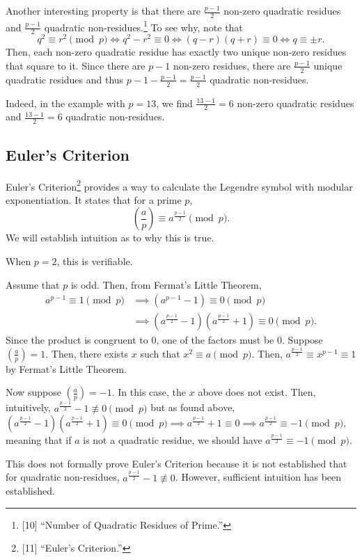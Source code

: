 \documentclass{article}
\newcommand{\qrn}[2]{\left( \frac{#1}{#2}\right)}
\begin{document}
Another interesting property is that there are $\frac{p-1}{2}$ non-zero quadratic residues and $\frac{p-1}{2}$ quadratic non-residues.\footnote{[10] “Number of Quadratic Residues of Prime.”} To see why, note that
\[q^2 \equiv r^2 \pmod p \iff q^2 - r^2 \equiv 0 \iff (q-r)(q+r) \equiv 0 \iff q \equiv \pm r.\]
Then, each non-zero quadratic residue has exactly two unique non-zero residues that square to it. Since there are $p-1$ non-zero residues, there are $\frac{p-1}{2}$ unique quadratic residues and thus $p-1 - \frac{p-1}{2} = \frac{p-1}{2}$ quadratic non-residues.

Indeed, in the example with $p=13$, we find $\frac{13-1}{2}=6$ non-zero quadratic residues and $\frac{13-1}{2}=6$ quadratic non-residues.
\subsection{Euler's Criterion}
Euler's Criterion\footnote{[11] “Euler's Criterion.”} provides a way to calculate the Legendre symbol with modular exponentiation. It states that for a prime $p$,
\[\left(\frac{a}{p}\right) \equiv a^{\frac{p-1}{2}} \pmod p.\]
We will establish intuition as to why this is true.

When $p=2$, this is verifiable.

Assume that $p$ is odd. Then, from Fermat's Little Theorem,
\begin{align*}a^{p-1} \equiv 1 \pmod p &\implies (a^{p-1}-1) \equiv 0 \pmod p \\ &\implies (a^{\frac{p-1}{2}}-1)(a^{\frac{p-1}{2}}+1) \equiv 0 \pmod p.\end{align*}
Since the product is congruent to 0, one of the factors must be 0.
Suppose $\qrn{a}{p}=1$. Then, there exists $x$ such that $x^2 \equiv a \pmod p$. Then, $a^{\frac{p-1}{2}} \equiv x^{p-1} \equiv 1$ by Fermat's Little Theorem.

Now suppose $\qrn{a}{p}=-1$. In this case, the $x$ above does not exist. Then, intuitively, $a^{\frac{p-1}{2}} -1 \not\equiv 0 \pmod p$ but as found above, $(a^{\frac{p-1}{2}}-1)(a^{\frac{p-1}{2}}+1) \equiv 0 \pmod p \implies a^{\frac{p-1}{2}} +1 \equiv 0 \implies a^{\frac{p-1}{2}} \equiv -1 \pmod p$, meaning that if $a$ is not a quadratic residue, we should have $a^{\frac{p-1}{2}} \equiv -1 \pmod p$.

This does not formally prove Euler's Criterion because it is not established that for quadratic non-residues, $a^{\frac{p-1}{2}} -1 \not \equiv 0$. However, sufficient intuition has been established.
\end{document}
